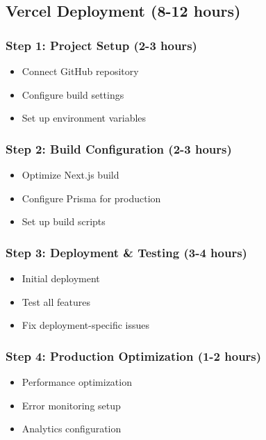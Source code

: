 \documentclass[11pt,a4paper]{article}
\begin{document}
\subsection{Vercel Deployment (8-12 hours)}

\subsubsection{Step 1: Project Setup (2-3 hours)}
\begin{itemize}
    \item Connect GitHub repository
    \item Configure build settings
    \item Set up environment variables
\end{itemize}

\subsubsection{Step 2: Build Configuration (2-3 hours)}
\begin{itemize}
    \item Optimize Next.js build
    \item Configure Prisma for production
    \item Set up build scripts
\end{itemize}

\subsubsection{Step 3: Deployment \& Testing (3-4 hours)}
\begin{itemize}
    \item Initial deployment
    \item Test all features
    \item Fix deployment-specific issues
\end{itemize}

\subsubsection{Step 4: Production Optimization (1-2 hours)}
\begin{itemize}
    \item Performance optimization
    \item Error monitoring setup
    \item Analytics configuration
\end{itemize}
\end{document}
